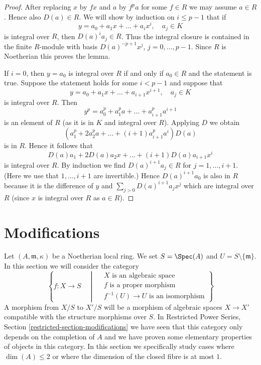 \begin{proof}
After replacing $x$ by $fx$ and $a$ by $f^pa$ for some $f \in R$
we may assume $a \in R$. Hence also $D(a) \in R$. We will show
by induction on $i \leq p - 1$ that if
$$
y = a_0 + a_1x + \ldots + a_i x^i,\quad a_j \in K
$$
is integral over $R$, then $D(a)^i a_j \in R$. Thus the integral
closure is contained in the finite $R$-module with basis
$D(a)^{-p + 1}x^j$, $j = 0, \ldots, p - 1$. Since $R$ is Noetherian
this proves the lemma.

\medskip\noindent
If $i = 0$, then $y = a_0$ is integral over $R$ if and only if $a_0 \in R$
and the statement is true. Suppose the statement holds for some $i < p - 1$
and suppose that
$$
y = a_0 + a_1x + \ldots + a_{i + 1} x^{i + 1},\quad a_j \in K
$$
is integral over $R$. Then
$$
y^p = a_0^p + a_1^p a + \ldots + a_{i + 1}^pa^{i + 1}
$$
is an element of $R$ (as it is in $K$ and integral over $R$). Applying
$D$ we obtain
$$
(a_1^p + 2a_2^p a + \ldots + (i + 1)a_{i + 1}^p a^i)D(a)
$$
is in $R$. Hence it follows that
$$
D(a)a_1 + 2D(a) a_2 x + \ldots + (i + 1)D(a) a_{i + 1} x^i
$$
is integral over $R$. By induction we find $D(a)^{i + 1}a_j \in R$
for $j = 1, \ldots, i + 1$. (Here we use that $1, \ldots, i + 1$
are invertible.) Hence $D(a)^{i + 1}a_0$ is also in $R$ because it
is the difference of $y$ and $\sum_{j > 0} D(a)^{i + 1}a_jx^j$ which
are integral over $R$ (since $x$ is integral over $R$ as $a \in R$).
\end{proof}


















\section{Modifications}
\label{section-modifications}

\noindent
Let $(A, \mathfrak m, \kappa)$ be a Noetherian local ring. We set
$S = \Spec(A)$ and $U = S \setminus \{\mathfrak m\}$. In this section
we will consider the category
\begin{equation}
\label{equation-modification}
\left\{
f : X \longrightarrow S
\quad \middle| \quad
\begin{matrix}
X\text{ is an algebraic space}\\
f\text{ is a proper morphism}\\
f^{-1}(U) \to U\text{ is an isomorphism}
\end{matrix}
\right\}
\end{equation}
A morphism from $X/S$ to $X'/S$ will be a morphism of algebraic spaces
$X \to X'$ compatible with the structure morphisms over $S$. In
Restricted Power Series, Section \ref{restricted-section-modifications}
we have seen that this category only depends on the completion of $A$
and we have proven some elementary properties of objects in this category.
In this section we specifically study cases where
$\dim(A) \leq 2$ or where the dimension of the closed fibre is at most $1$.


